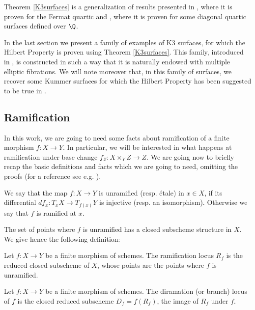 Theorem \ref{K3surfaces} is a generalization of results presented in \cite{articoloHP}, where it is proven for the Fermat quartic and \cite{myarticle1}, where it is proven for some diagonal quartic surfaces defined over $\Q$. 


In the last section we present a family of examples of K3 surfaces, for which the Hilbert Property is proven using Theorem \ref{K3surfaces}. This family, introduced in \cite{garbagnati}, is constructed in such a way that it is naturally endowed with multiple elliptic fibrations. We will note moreover that, in this family of surfaces, we recover some Kummer surfaces for which the Hilbert Property has been suggested to be true in \cite{articoloHP}.




\subsection{Ramification}	
	
	In this work, we are going to need some facts about ramification of a finite morphism $f:X \rightarrow Y$. In particular, we will be interested in what happens at ramification under base change $f_Z:X \times_YZ \rightarrow Z$. We are going now to briefly recap the basic definitions and facts which we are going to need, omitting the proofs (for a reference see e.g. \cite[Tag 0C3H]{stacks-project}).

\begin{definition}
	We say that the map $f:X \rightarrow Y$ is unramified (resp. étale) in $x \in X$, if its differential $df_x:T_xX\rightarrow T_{f(x)}Y$ is injective (resp. an isomorphism). Otherwise we say that $f$ is ramified at $x$.
\end{definition}
The set of points where $f$ is unramified has a closed subscheme structure in $X$. We give hence the following definition:
\begin{definition}\label{ramif}
	Let $f:X \rightarrow Y$ be a finite morphism of schemes. The ramification locus $R_f$ is the reduced closed subscheme of $X$, whose points are the points where $f$ is unramified.
\end{definition}

	\begin{definition}\label{dira}
	Let $f:X \rightarrow Y$ be a finite morphism of schemes. The diramation (or branch) locus of $f$ is the closed reduced subscheme $D_f=f(R_f)$, the image of $R_f$ under $f$.
\end{definition}

